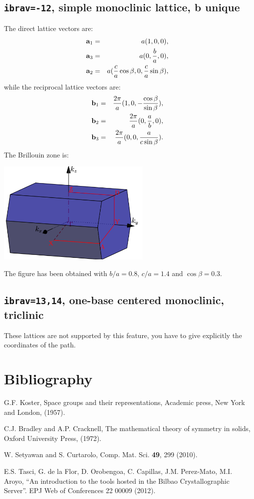 \documentclass[12pt,a4paper]{article}
\begin{document}
\subsection{\texttt{ibrav=-12}, simple monoclinic lattice, b unique}
The direct lattice vectors are:
\begin{eqnarray}
{\bf a}_1 &=& a (1, 0, 0), \nonumber \\
{\bf a}_3 &=& a (0, {b \over a}, 0), \nonumber \\
{\bf a}_2 &=& a ({c \over a} \cos{\beta}, 0, {c \over a}\sin{\beta}), \nonumber 
\end{eqnarray}
while the reciprocal lattice vectors are:
\begin{eqnarray}
{\bf b}_1 &=& {2\pi \over a} (1, 0, -{\cos{\beta}\over \sin{\beta}}), \nonumber \\
{\bf b}_2 &=& {2\pi \over a} (0, {a \over b}, 0), \nonumber \\
{\bf b}_3 &=& {2\pi \over a} (0, 0, {a \over c \sin{\beta}}). \nonumber
\end{eqnarray}
The Brillouin zone is: 
\begin{center}
\includegraphics[width=7.5cm,angle=0]{images/monob.png} 
\end{center}
The figure has been obtained with $b/a=0.8$, $c/a=1.4$ and $\cos{\beta}=0.3$.


\subsection{\texttt{ibrav=13,14}, one-base centered monoclinic,
triclinic}
These lattices are not supported by this feature, you have to give
explicitly the coordinates of the path.

\section{Bibliography}

\noindent [1] G.F. Koster, Space groups and their representations, Academic press,
New York and London, (1957). 

\noindent [2] C.J. Bradley and A.P. Cracknell, The mathematical theory of symmetry
in solids, Oxford University Press, (1972).

\noindent [3] W. Setyawan and S. Curtarolo, Comp. Mat. Sci.  {\bf 49}, 299 (2010).

\noindent [4] E.S. Tasci, G. de la Flor, D. Orobengoa, C. Capillas, 
J.M. Perez-Mato, M.I. Aroyo, ``An introduction to the tools hosted in the 
Bilbao Crystallographic Server''. EPJ Web of Conferences 22 00009 (2012).
\end{document}
